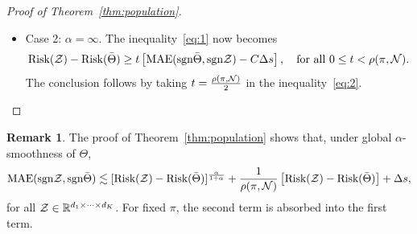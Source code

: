 \documentclass[twoside,11pt]{article}
\theoremstyle{definition}
\newtheorem{rmk}{Remark}
\def\sign{\textup{sgn}}
\def\risk{\textup{Risk}}
\begin{document}
\begin{proof}[Proof of Theorem~\ref{thm:population}]
\begin{itemize}[leftmargin=*,topsep=0pt,itemsep=-1ex,partopsep=1ex,parsep=1ex]
where $C(\pi)>0$ is a multiplicative factor independent of $\tZ$. 
\item Case 2: $\alpha=\infty$. The inequality~\eqref{eq:1} now becomes
\begin{equation}\label{eq:2}
\risk(\tZ)- \risk(\bar \Theta) \geq t\left[\textup{MAE}(\sign \bar\Theta, \sign \tZ)-C\Delta s\right], \quad \text{for all }0\leq t< \rho(\pi,\tN).
\end{equation}
The conclusion follows by taking $t={\rho(\pi, \mathcal{N})\over 2}$ in the inequality~\eqref{eq:2}. 
\end{itemize}
\end{proof}
\begin{rmk}\label{eq:rmk}The proof of Theorem~\ref{thm:population} shows that, under global $\alpha$-smoothness of $\Theta$, 
\begin{equation}\label{eq:remark}
\textup{MAE}(\sign \tZ,\sign \bar \Theta)  \lesssim [\risk(\tZ)- \risk(\bar \Theta)]^{\alpha\over 1+\alpha}+{1\over \rho(\pi, \tN)} \left[\risk(\tZ)- \risk(\bar \Theta)\right]+\Delta s,
\end{equation}
for all $\mathcal{Z}\in\mathbb{R}^{d_1\times \cdots \times d_K}$. For fixed $\pi$, the second term is absorbed into the first term. 
\end{rmk}
\end{document}
